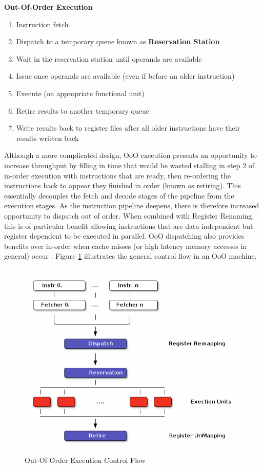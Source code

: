 \documentclass[12pt]{report}
\begin{document}
\newpage

\textbf{Out-Of-Order Execution}
\begin{enumerate}
\item Instruction fetch
\item Dispatch to a temporary queue known as \textbf{Reservation Station}
\item Wait in the reservation station until operands are available
\item Issue once operands are available (even if before an older
instruction)
\item Execute (on appropriate functional unit)
\item Retire results to another temporary queue
\item Write results back to register files after all older instructions have their results written back
\end{enumerate}

Although a more complicated design, OoO execution presents an opportunity to
increase throughput by filling in time that would be wasted stalling in step
2 of in-order execution with instructions that are ready, then re-ordering
the instructions back to appear they finished in order (known as retiring).
This essentially decouples the fetch and decode stages of the pipeline from
the execution stages. As the instruction pipeline deepens, there is therefore
increased opportunity to dispatch out of order. When combined with Register
Renaming, this is of particular benefit allowing instructions that are data
independent but register dependent to be executed in parallel. OoO
dispatching also provides benefits over in-order when cache misses (or high
latency memory accesses in general) occur \parencite{stark1997reducing}.
Figure \ref{fig:OutOfOrder} illustrates the general control flow in an OoO machine.

\begin{figure}[htbp]
\centering
\includegraphics[width=1.0\textwidth]{figures/OoODiagram.png}
\caption{\label{fig:OutOfOrder}
Out-Of-Order Execution Control Flow}
\end{figure}
\end{document}
